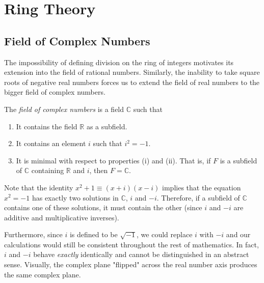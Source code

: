 \documentclass{article}
\begin{document}
\section{Ring Theory}

  \subsection{Field of Complex Numbers}

    The impossibility of defining division on the ring of integers motivates its extension into the field of rational numbers. Similarly, the inability to take square roots of negative real numbers forces us to extend the field of real numbers to the bigger field of complex numbers. 

    \begin{definition}
      The \textit{field of complex numbers} is a field $\mathbb{C}$ such that 
      \begin{enumerate}
        \item It contains the field $\mathbb{R}$ as a subfield. 
        \item It contains an element $i$ such that $i^2 = -1$.
        \item It is minimal with respect to properties (i) and (ii). That is, if $F$ is a subfield of $\mathbb{C}$ containing $\mathbb{R}$ and $i$, then $F = \mathbb{C}$. 
      \end{enumerate}
    \end{definition}

    Note that the identity $x^2 + 1 \equiv (x + i) (x - i)$ implies that the equation $x^2 = -1$ has exactly two solutions in $\mathbb{C}$, $i$ and $-i$. Therefore, if a subfield of $\mathbb{C}$ contains one of these solutions, it must contain the other (since $i$ and $-i$ are additive and multiplicative inverses). 

    Furthermore, since $i$ is defined to be $\sqrt{-1}$, we could replace $i$ with $-i$ and our calculations would still be consistent throughout the rest of mathematics. In fact, $i$ and $-i$ behave \textit{exactly} identically and cannot be distinguished in an abstract sense. Visually, the complex plane "flipped" across the real number axis produces the same complex plane. 
\end{document}
